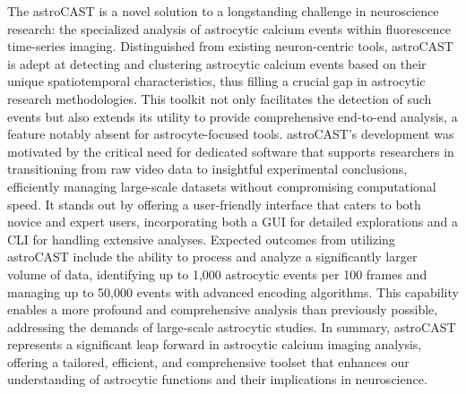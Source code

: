 The \ac{astroCAST} is a novel solution to a longstanding challenge in neuroscience
research: the specialized analysis of astrocytic calcium events within fluorescence time-series imaging.
Distinguished from existing neuron-centric tools, \ac{astroCAST} is adept at detecting and clustering astrocytic calcium
events based on their unique spatiotemporal characteristics, thus filling a crucial gap in astrocytic research
methodologies.
This toolkit not only facilitates the detection of such events but also extends its utility to provide comprehensive
end-to-end analysis, a feature notably absent for astrocyte-focused tools.
\ac{astroCAST}'s development was motivated by the critical need for dedicated software that supports researchers in
transitioning from raw video data to insightful experimental conclusions, efficiently managing large-scale datasets
without compromising computational speed.
It stands out by offering a user-friendly interface that caters to both novice and expert users, incorporating both a
\ac{GUI} for detailed explorations and a \ac{CLI} for handling extensive
analyses.
Expected outcomes from utilizing \ac{astroCAST} include the ability to process and analyze a significantly larger volume
of data, identifying up to 1,000 astrocytic events per 100 frames and managing up to 50,000 events with advanced
encoding algorithms.
This capability enables a more profound and comprehensive analysis than previously possible, addressing the demands
of large-scale astrocytic studies.
In summary, \ac{astroCAST} represents a significant leap forward in astrocytic calcium imaging analysis, offering a
tailored, efficient, and comprehensive toolset that enhances our understanding of astrocytic functions and their
implications in neuroscience.